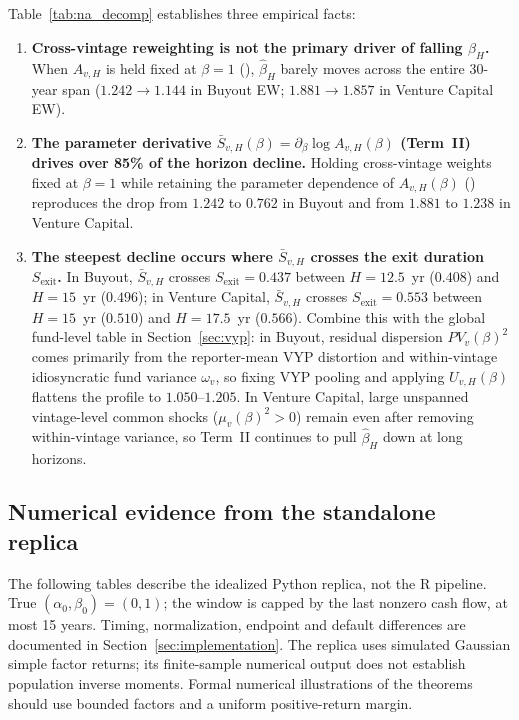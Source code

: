 \documentclass[11pt]{article}
\newcommand{\code}[1]{\texttt{\detokenize{#1}}}
\theoremstyle{plain}
\theoremstyle{definition}
\begin{document}
Table~\ref{tab:na_decomp} establishes three empirical facts:
\begin{enumerate}
\item \textbf{Cross-vintage reweighting is not the primary driver of falling $\hat\beta_H$.} When $A_{v,H}$ is held fixed at $\beta=1$ (\code{Fix-A}), $\hat\beta_H$ barely moves across the entire 30-year span ($1.242\to 1.144$ in Buyout EW; $1.881\to 1.857$ in Venture Capital EW).
\item \textbf{The parameter derivative $\bar S_{v,H}(\beta)=\partial_\beta\log A_{v,H}(\beta)$ (Term~II) drives over 85\% of the horizon decline.} Holding cross-vintage weights fixed at $\beta=1$ while retaining the parameter dependence of $A_{v,H}(\beta)$ (\code{Jac}) reproduces the drop from $1.242$ to $0.762$ in Buyout and from $1.881$ to $1.238$ in Venture Capital.
\item \textbf{The steepest decline occurs where $\bar S_{v,H}$ crosses the exit duration $S_{\mathrm{exit}}$.} In Buyout, $\bar S_{v,H}$ crosses $S_{\mathrm{exit}}=0.437$ between $H=12.5$~yr ($0.408$) and $H=15$~yr ($0.496$); in Venture Capital, $\bar S_{v,H}$ crosses $S_{\mathrm{exit}}=0.553$ between $H=15$~yr ($0.510$) and $H=17.5$~yr ($0.566$). Combine this with the global fund-level table in Section~\ref{sec:vyp}: in Buyout, residual dispersion $PV_v(\beta)^2$ comes primarily from the reporter-mean VYP distortion and within-vintage idiosyncratic fund variance $\omega_v$, so fixing VYP pooling and applying $U_{v,H}(\beta)$ flattens the profile to $1.050$--$1.205$. In Venture Capital, large unspanned vintage-level common shocks ($\mu_v(\beta)^2>0$) remain even after removing within-vintage variance, so Term~II continues to pull $\hat\beta_H$ down at long horizons.
\end{enumerate}

\subsection{Numerical evidence from the standalone replica}
\label{app:numerical}

The following tables describe the idealized Python replica, not the R pipeline. True $(\alpha_0,\beta_0)=(0,1)$; the window is capped by the last nonzero cash flow, at most 15 years. Timing, normalization, endpoint and default differences are documented in Section~\ref{sec:implementation}. The replica uses simulated Gaussian simple factor returns; its finite-sample numerical output does not establish population inverse moments. Formal numerical illustrations of the theorems should use bounded factors and a uniform positive-return margin.
\end{document}
